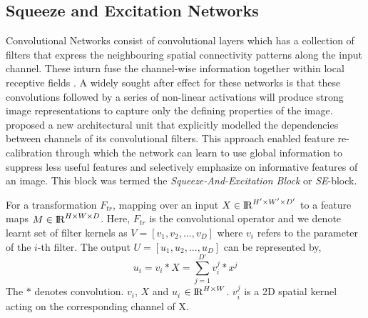 \documentclass[fleqn,usenatbib]{mnras}
\begin{document}
\subsection{Squeeze and Excitation Networks}
\hspace{0.25 in}Convolutional Networks consist of convolutional layers which has a collection of filters that express the neighbouring spatial connectivity patterns along the input channel. These inturn fuse the channel-wise information together within local receptive fields \citep{hu2018squeeze}. A widely sought after effect for these networks is that these convolutions followed by a series of non-linear activations will produce strong image representations to capture only the defining properties of the image. \citet{hu2018squeeze} proposed a new architectural unit that explicitly modelled the dependencies between channels of its convolutional filters. This approach enabled feature re-calibration through which the network can learn to use global information to suppress less useful features and selectively emphasize on informative features of an image. This block was termed the \textit{Squeeze-And-Excitation Block} or \textit{SE}-block.

For a transformation $F_{tr}$, mapping over an input $X \in {\rm I\!R}^{H'\times W' \times D'}$ to a feature maps $M\in {\rm I\!R}^{H\times W \times D}$. Here, $F_{tr}$ is the convolutional operator and we denote learnt set of filter kernels as $V = [v_1, v_2, ..., v_D]$ where $v_i$ refers to the parameter of the $i$-th filter. The output $U = [u_1, u_2, ..., u_D]$ can be represented by,
\begin{equation}
    u_i = v_i \ast X = \sum_{j=1}^{D'}{v_i^j \ast x^j}
    \label{SE convolutional eqn}
\end{equation}
\hspace{0.25 in}The $\ast$ denotes convolution. $v_i$, $X$ and $u_i$ $\in {\rm I\!R}^{H\times W}$. $v_i^j$ is a 2D spatial kernel acting on the corresponding channel of X. 
\end{document}
